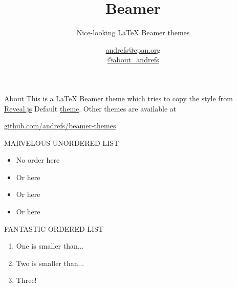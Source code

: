 \documentclass[serif,14pt,color=usenames,dvipsnames]{beamer}
\title{Beamer}
\subtitle{Nice-looking LaTeX Beamer themes}
\author{\href{mailto:andrefs@cpan.org}{andrefs@cpan.org}\\\href{http://twitter.com/about\_andrefs}{@about\_andrefs}}
\institute{Institute, Location}
\begin{document}
\begin{frame}
\maketitle
\end{frame}

\begin{frame}{About}
This is a LaTeX Beamer theme which tries to copy the style from \href{http://lab.hakim.se/reveal-js}{Reveal.js} Default \href{http://lab.hakim.se/reveal-js/?theme=default}{theme}. Other themes are available at
\begin{center}
\url{github.com/andrefs/beamer-themes}
\end{center}
\end{frame}

\begin{frame}{MARVELOUS UNORDERED LIST}
\begin{itemize}
\item No order here
\item Or here
\item Or here
\item Or here
\end{itemize}
\end{frame}

\begin{frame}{FANTASTIC ORDERED LIST}
\begin{enumerate}
	\item One is smaller than...
	\item Two is smaller than...
	\item Three!
\end{enumerate}
\end{frame}
\end{document}
